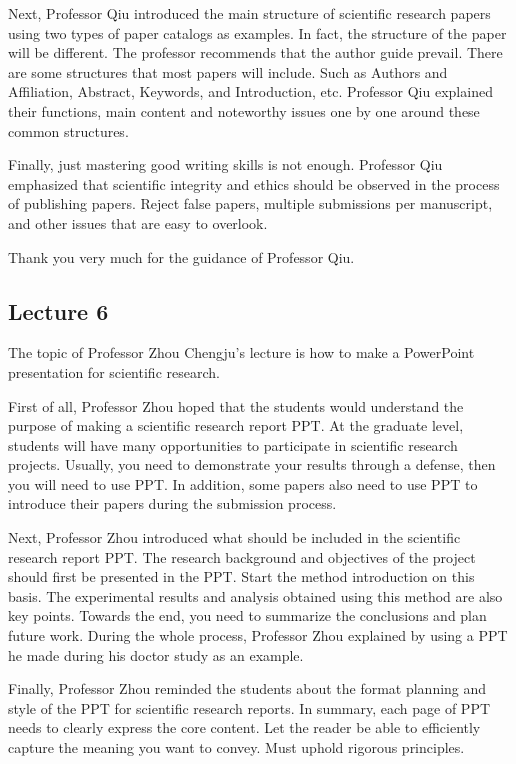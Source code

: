 \documentclass[UTF-8]{ctexart}
\begin{document}
Next, Professor Qiu introduced the main structure of scientific research papers using two types of paper catalogs as examples. In fact, the structure of the paper will be different. The professor recommends that the author guide prevail. There are some structures that most papers will include. Such as Authors and Affiliation, Abstract, Keywords, and Introduction, etc. Professor Qiu explained their functions, main content and noteworthy issues one by one around these common structures.

Finally, just mastering good writing skills is not enough. Professor Qiu emphasized that scientific integrity and ethics should be observed in the process of publishing papers. Reject false papers, multiple submissions per manuscript, and other issues that are easy to overlook.

Thank you very much for the guidance of Professor Qiu.

\subsection{Lecture 6}
The topic of Professor Zhou Chengju’s lecture is how to make a PowerPoint presentation for scientific research. 

First of all, Professor Zhou hoped that the students would understand the purpose of making a scientific research report PPT. At the graduate level, students will have many opportunities to participate in scientific research projects. Usually, you need to demonstrate your results through a defense, then you will need to use PPT. In addition, some papers also need to use PPT to introduce their papers during the submission process. 

Next, Professor Zhou introduced what should be included in the scientific research report PPT. The research background and objectives of the project should first be presented in the PPT. Start the method introduction on this basis. The experimental results and analysis obtained using this method are also key points. Towards the end, you need to summarize the conclusions and plan future work. During the whole process, Professor Zhou explained by using a PPT he made during his doctor study as an example.

Finally, Professor Zhou reminded the students about the format planning and style of the PPT for scientific research reports. In summary, each page of PPT needs to clearly express the core content. Let the reader be able to efficiently capture the meaning you want to convey. Must uphold rigorous principles. 
\end{document}
